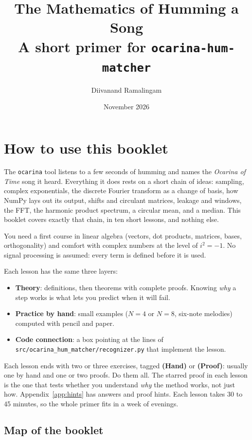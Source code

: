 \documentclass[11pt]{article}
\title{\bfseries The Mathematics of Humming a Song\\[4pt]
\large A short primer for \texttt{ocarina-hum-matcher}}
\author{Diivanand Ramalingam}
\date{November 2026}
\theoremstyle{definition}
\newcommand{\code}[1]{\texttt{#1}}
\begin{document}
\maketitle

\section*{How to use this booklet}

The \code{ocarina} tool listens to a few seconds of humming and names the
\emph{Ocarina of Time} song it heard. Everything it does rests on a short chain of
ideas: sampling, complex exponentials, the discrete Fourier transform as a change of
basis, how NumPy lays out its output, shifts and circulant matrices, leakage and
windows, the FFT, the harmonic product spectrum, a circular mean, and a median. This
booklet covers exactly that chain, in ten short lessons, and nothing else.

You need a first course in linear algebra (vectors, dot products, matrices, bases,
orthogonality) and comfort with complex numbers at the level of $i^2=-1$. No signal
processing is assumed: every term is defined before it is used.

Each lesson has the same three layers:
\begin{itemize}
  \item \textbf{Theory}: definitions, then theorems with complete proofs. Knowing
  \emph{why} a step works is what lets you predict when it will fail.
  \item \textbf{Practice by hand}: small examples ($N=4$ or $N=8$, six-note melodies)
  computed with pencil and paper.
  \item \textbf{Code connection}: a box pointing at the lines of
  \nolinkurl{src/ocarina_hum_matcher/recognizer.py} that implement the lesson.
\end{itemize}

Each lesson ends with two or three exercises, tagged \textbf{(Hand)} or
\textbf{(Proof)}: usually one by hand and one or two proofs. Do them all. The starred
proof in each lesson is the one that tests whether you understand \emph{why} the method
works, not just how. Appendix~\ref{app:hints} has answers and proof hints. Each lesson
takes 30 to 45 minutes, so the whole primer fits in a week of evenings.

\subsection*{Map of the booklet}
\end{document}
